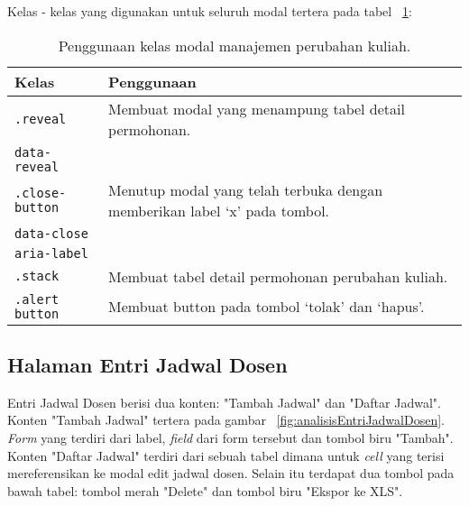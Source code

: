 \noindent Kelas - kelas yang digunakan untuk seluruh modal tertera pada tabel ~\ref{table:analisisModalManajemenPerubahanKuliah}:
\begin{table}[H]
	\centering
	\caption{Penggunaan kelas modal manajemen perubahan kuliah.}
	\begin{tabularx}{\textwidth}{lX}
		\toprule
		Kelas     & Penggunaan \\
		\midrule
		\texttt{.reveal} & Membuat modal yang menampung tabel detail permohonan.\\
		\texttt{data-reveal}&\\
		\texttt{.close-button} & Menutup modal yang telah terbuka dengan memberikan label `x' pada tombol.\\
		\texttt{data-close}& \\
		\texttt{aria-label}& \\
		\texttt{.stack} &	Membuat tabel detail permohonan perubahan kuliah.\\
		\texttt{.alert button} & Membuat button pada tombol `tolak'  dan `hapus'.\\
		\bottomrule
	\end{tabularx}	
	\label{table:analisisModalManajemenPerubahanKuliah}
\end{table}


\subsection{Halaman Entri Jadwal Dosen}
Entri Jadwal Dosen berisi dua konten: "Tambah Jadwal" dan "Daftar Jadwal". Konten "Tambah Jadwal" tertera pada gambar ~\ref{fig:analisisEntriJadwalDosen}. \textit{Form} yang terdiri dari label, \textit{field} dari form tersebut dan tombol biru "Tambah". Konten "Daftar Jadwal" terdiri dari sebuah tabel dimana untuk \textit{cell} yang terisi mereferensikan ke modal edit jadwal dosen. Selain itu terdapat dua tombol pada bawah tabel: tombol merah "Delete" dan tombol biru "Ekspor ke XLS".

